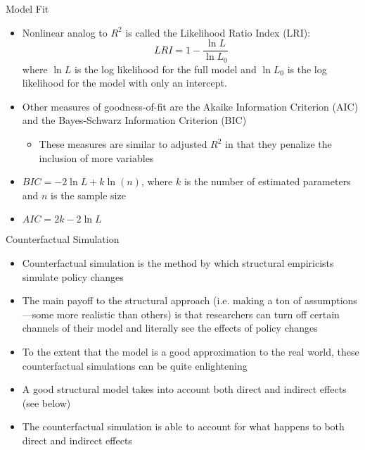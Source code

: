 \documentclass[english,xcolor=dvipsnames]{beamer}
\begin{document}
\begin{frame}{Model Fit}
\begin{itemize}
\item Nonlinear analog to $R^{2}$ is called the Likelihood Ratio Index
(LRI):
\[
LRI=1-\frac{\ln L}{\ln L_{0}}
\]
where $\ln L$ is the log likelihood for the full model and $\ln L_{0}$
is the log likelihood for the model with only an intercept.
\item Other measures of goodness-of-fit are the Akaike Information Criterion
(AIC) and the Bayes-Schwarz Information Criterion (BIC)

\begin{itemize}
\item These measures are similar to adjusted $R^{2}$ in that they penalize
the inclusion of more variables
\end{itemize}
\item $BIC=-2\ln L+k\ln\left(n\right)$, where $k$ is the number of estimated
parameters and $n$ is the sample size
\item $AIC=2k-2\ln L$
\end{itemize}

\end{frame}


\begin{frame}{Counterfactual Simulation}
\begin{itemize}
\item Counterfactual simulation is the method by which structural empiricists
simulate policy changes
\item The main payoff to the structural approach (i.e. making a ton of assumptions---some
more realistic than others) is that researchers can turn off certain
channels of their model and literally see the effects of policy changes
\item To the extent that the model is a good approximation to the real world,
these counterfactual simulations can be quite enlightening
\item A good structural model takes into account both direct and indirect
effects (see below)
\item The counterfactual simulation is able to account for what happens
to both direct and indirect effects
\end{itemize}

\end{frame}
\end{document}
